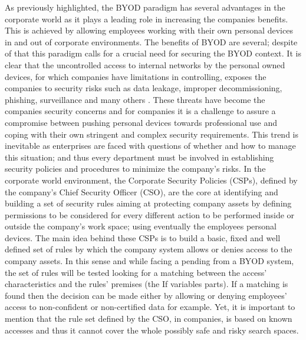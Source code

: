 \documentclass[runningheads,a4paper]{llncs}
\begin{document}
As previously highlighted, the BYOD paradigm has several advantages in
the corporate world as it plays a leading role in increasing the
companies benefits. This is achieved by allowing employees working
with their own personal devices in and out of corporate
environments. The benefits of BYOD are several; despite of that this
paradigm calls for a crucial need for securing the BYOD context. It is
clear that the uncontrolled access to internal networks by the
personal owned devices, for which companies have limitations in
controlling, exposes the companies to security risks such as data
leakage, improper decommissioning, phishing, surveillance and many
others \cite{lennon2012changing}. These threats have become the
companies security concerns and for companies it is a challenge to
assure a compromise between pushing personal devices towards
professional use and coping with their own stringent and complex
security requirements. This trend is inevitable as enterprises are
faced with questions of whether and how to manage this situation; and
thus every department must be involved in establishing security
policies and procedures to minimize the company's risks. In the
corporate world environment, the Corporate Security Policies (CSPs),
defined by the company's Chief Security Officer (CSO), are the core at
identifying and building a set of security rules aiming at protecting
company assets by defining permissions to be considered for every
different action to be performed inside or outside the company's work
space; using eventually the employees personal devices. The main idea
behind these CSPs is to build a basic, fixed and well defined set of
rules by which the company system allows or denies access to the
company assets. In this sense and while facing a pending from a BYOD
system, the set of rules will be tested looking for a matching between
the access' characteristics and the rules' premises (the If variables
parts). If a matching is found then the decision can be made either by
allowing or denying employees' access to non-confident or
non-certified data for example. Yet, it is important to mention that
the rule set defined by the CSO, in companies, is based on known
accesses and thus it cannot cover the whole possibly safe and risky
search spaces. 
\end{document}
